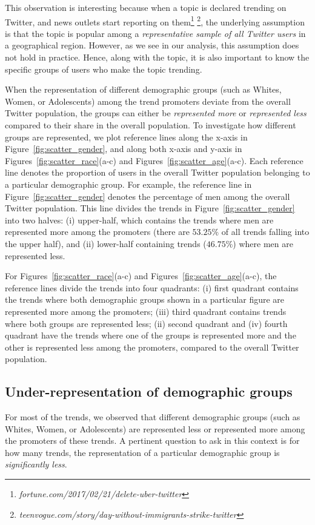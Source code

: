 \documentclass[letterpaper]{article}
\begin{document}
This observation is interesting because when a topic is declared trending on Twitter,
and news outlets start reporting on
them\footnote{\it fortune.com/2017/02/21/delete-uber-twitter}
\footnote{\it teenvogue.com/story/day-without-immigrants-strike-twitter},
the underlying assumption is that the topic is popular among a {\it representative sample
of all Twitter users} in a geographical region.
However, as we see in our analysis, this assumption does not hold in practice.
Hence, along with the topic, it is also important to know the specific groups of users
who make the topic trending.

When the representation of different demographic groups
(such as Whites, Women, or Adolescents) among the trend promoters
deviate from the overall Twitter population,
the groups can either be {\it represented more} or {\it represented less}
compared to their share in the overall population.
To investigate how different groups are represented,
we plot reference lines along the x-axis in Figure~\ref{fig:scatter_gender},
and along both x-axis and y-axis in
Figures~\ref{fig:scatter_race}(a-c) and Figures~\ref{fig:scatter_age}(a-c).
Each reference line denotes the proportion of users in the overall Twitter
population belonging to a particular demographic group.
For example, the reference line in Figure~\ref{fig:scatter_gender} denotes
the percentage of men among the overall Twitter population.
This line divides the trends in Figure~\ref{fig:scatter_gender}
into two halves: (i) upper-half, which contains the trends where men are represented
more among the promoters
(there are $53.25\%$ of all trends falling into the upper half),
and (ii) lower-half containing trends ($46.75\%$) where men are represented less.

For Figures~\ref{fig:scatter_race}(a-c) and Figures~\ref{fig:scatter_age}(a-c),
the reference lines divide the trends
into four quadrants: (i) first quadrant contains the trends where both demographic groups shown in a particular figure
are represented more among the promoters; (iii) third quadrant contains trends where both groups
are represented less; (ii) second quadrant and (iv) fourth quadrant have the trends where one of the
groups is represented more and the other is represented less among the promoters,
compared to the overall Twitter population.

\subsection{Under-representation of demographic groups}
\noindent
For most of the trends, we observed that different demographic groups
(such as Whites, Women, or Adolescents)
are represented less or represented more among the promoters of these trends. 
A pertinent question to ask in this context is for how many trends,
the representation of a particular demographic group is {\it significantly less}.
\end{document}
